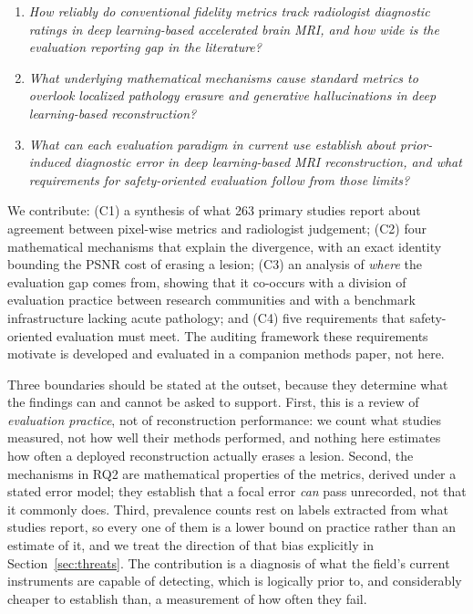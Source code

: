 \documentclass[review,authoryear]{elsarticle}
\begin{document}
\begin{enumerate}
\item[\textbf{RQ1}] \emph{How reliably do conventional fidelity metrics track
radiologist diagnostic ratings in deep learning-based accelerated brain MRI, and how
wide is the evaluation reporting gap in the literature?}
\item[\textbf{RQ2}] \emph{What underlying mathematical mechanisms cause standard metrics
to overlook localized pathology erasure and generative hallucinations in deep
learning-based reconstruction?}
\item[\textbf{RQ3}] \emph{What can each evaluation paradigm in current use establish
about prior-induced diagnostic error in deep learning-based MRI reconstruction, and
what requirements for safety-oriented evaluation follow from those limits?}
\end{enumerate}

We contribute: (C1) a synthesis of what 263 primary studies report about agreement
between pixel-wise metrics and radiologist judgement; (C2) four mathematical mechanisms
that explain the divergence, with an exact identity bounding the PSNR cost of erasing a
lesion; (C3) an analysis of \emph{where} the evaluation gap comes from, showing that it
co-occurs with a division of evaluation practice between research communities and with
a benchmark infrastructure lacking acute pathology; and (C4) five requirements
that safety-oriented evaluation must meet. The auditing framework these requirements
motivate is developed and evaluated in a companion methods paper, not here.

Three boundaries should be stated at the outset, because they determine what the
findings can and cannot be asked to support. First, this is a review of \emph{evaluation
practice}, not of reconstruction performance: we count what studies measured, not how
well their methods performed, and nothing here estimates how often a deployed
reconstruction actually erases a lesion. Second, the mechanisms in RQ2 are mathematical
properties of the metrics, derived under a stated error model; they establish that a
focal error \emph{can} pass unrecorded, not that it commonly does. Third, prevalence
counts rest on labels extracted from what studies report, so every one of them is a
lower bound on practice rather than an estimate of it, and we treat the direction of
that bias explicitly in Section~\ref{sec:threats}. The contribution is a diagnosis of
what the field's current instruments are capable of detecting, which is logically prior
to, and considerably cheaper to establish than, a measurement of how often they fail.
\end{document}
